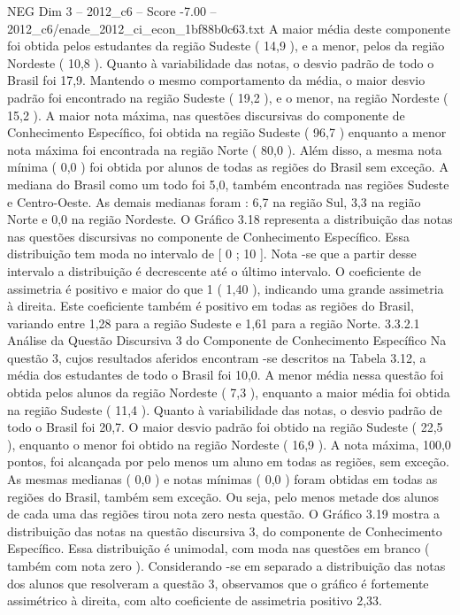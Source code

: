 \begin{textsample}{NEG Dim 3 – 2012\_c6 – Score -7.00 – 2012\_c6/enade\_2012\_ci\_econ\_1bf88b0c63.txt}
A maior média deste componente foi obtida pelos estudantes da região Sudeste ( 14,9 ), e a menor, pelos da região Nordeste ( 10,8 ).
Quanto à variabilidade das notas, o desvio padrão de todo o Brasil foi 17,9.
Mantendo o mesmo comportamento da média, o maior desvio padrão foi encontrado na região Sudeste ( 19,2 ), e o menor, na região Nordeste ( 15,2 ).
A maior nota máxima, nas questões discursivas do componente de Conhecimento Específico, foi obtida na região Sudeste ( 96,7 ) enquanto a menor nota máxima foi encontrada na região Norte ( 80,0 ).
Além disso, a mesma nota mínima ( 0,0 ) foi obtida por alunos de todas as regiões do Brasil sem exceção.
A mediana do Brasil como um todo foi 5,0, também encontrada nas regiões Sudeste e Centro-Oeste.
As demais medianas foram : 6,7 na região Sul, 3,3 na região Norte e 0,0 na região Nordeste.
O Gráfico 3.18 representa a distribuição das notas nas questões discursivas no componente de Conhecimento Específico.
Essa distribuição tem moda no intervalo de [ 0 ; 10 ].
Nota -se que a partir desse intervalo a distribuição é decrescente até o último intervalo.
O coeficiente de assimetria é positivo e maior do que 1 ( 1,40 ), indicando uma grande assimetria à direita.
Este coeficiente também é positivo em todas as regiões do Brasil, variando entre 1,28 para a região Sudeste e 1,61 para a região Norte. 3.3.2.1 Análise da Questão Discursiva 3 do Componente de Conhecimento Específico Na questão 3, cujos resultados aferidos encontram -se descritos na Tabela 3.12, a média dos estudantes de todo o Brasil foi 10,0.
A menor média nessa questão foi obtida pelos alunos da região Nordeste ( 7,3 ), enquanto a maior média foi obtida na região Sudeste ( 11,4 ).
Quanto à variabilidade das notas, o desvio padrão de todo o Brasil foi 20,7.
O maior desvio padrão foi obtido na região Sudeste ( 22,5 ), enquanto o menor foi obtido na região Nordeste ( 16,9 ).
A nota máxima, 100,0 pontos, foi alcançada por pelo menos um aluno em todas as regiões, sem exceção.
As mesmas medianas ( 0,0 ) e notas mínimas ( 0,0 ) foram obtidas em todas as regiões do Brasil, também sem exceção.
Ou seja, pelo menos metade dos alunos de cada uma das regiões tirou nota zero nesta questão.
O Gráfico 3.19 mostra a distribuição das notas na questão discursiva 3, do componente de Conhecimento Específico.
Essa distribuição é unimodal, com moda nas questões em branco ( também com nota zero ).
Considerando -se em separado a distribuição das notas dos alunos que resolveram a questão 3, observamos que o gráfico é fortemente assimétrico à direita, com alto coeficiente de assimetria positivo 2,33.

\end{textsample}
